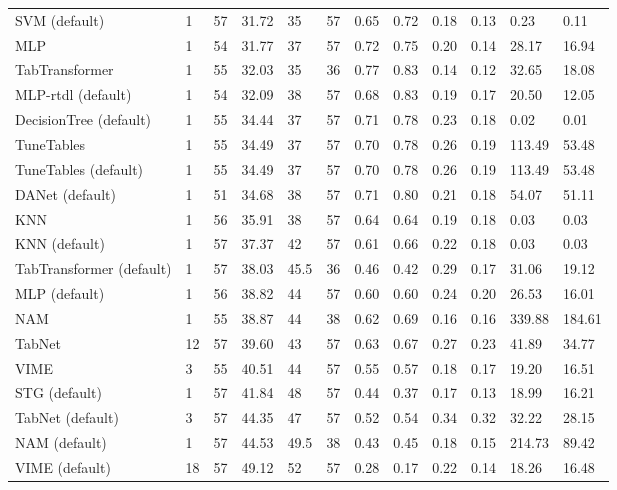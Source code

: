 \begin{tabular}{lllllrllllll}
SVM (default) & 1 & 57 & 31.72 & 35 & 57 & 0.65 & 0.72 & 0.18 & 0.13 & 0.23 & 0.11 \\
MLP & 1 & 54 & 31.77 & 37 & 57 & 0.72 & 0.75 & 0.20 & 0.14 & 28.17 & 16.94 \\
TabTransformer & 1 & 55 & 32.03 & 35 & 36 & 0.77 & 0.83 & 0.14 & 0.12 & 32.65 & 18.08 \\
MLP-rtdl (default) & 1 & 54 & 32.09 & 38 & 57 & 0.68 & 0.83 & 0.19 & 0.17 & 20.50 & 12.05 \\
DecisionTree (default) & 1 & 55 & 34.44 & 37 & 57 & 0.71 & 0.78 & 0.23 & 0.18 & 0.02 & 0.01 \\
TuneTables & 1 & 55 & 34.49 & 37 & 57 & 0.70 & 0.78 & 0.26 & 0.19 & 113.49 & 53.48 \\
TuneTables (default) & 1 & 55 & 34.49 & 37 & 57 & 0.70 & 0.78 & 0.26 & 0.19 & 113.49 & 53.48 \\
DANet (default) & 1 & 51 & 34.68 & 38 & 57 & 0.71 & 0.80 & 0.21 & 0.18 & 54.07 & 51.11 \\
KNN & 1 & 56 & 35.91 & 38 & 57 & 0.64 & 0.64 & 0.19 & 0.18 & 0.03 & 0.03 \\
KNN (default) & 1 & 57 & 37.37 & 42 & 57 & 0.61 & 0.66 & 0.22 & 0.18 & 0.03 & 0.03 \\
TabTransformer (default) & 1 & 57 & 38.03 & 45.5 & 36 & 0.46 & 0.42 & 0.29 & 0.17 & 31.06 & 19.12 \\
MLP (default) & 1 & 56 & 38.82 & 44 & 57 & 0.60 & 0.60 & 0.24 & 0.20 & 26.53 & 16.01 \\
NAM & 1 & 55 & 38.87 & 44 & 38 & 0.62 & 0.69 & 0.16 & 0.16 & 339.88 & 184.61 \\
TabNet & 12 & 57 & 39.60 & 43 & 57 & 0.63 & 0.67 & 0.27 & 0.23 & 41.89 & 34.77 \\
VIME & 3 & 55 & 40.51 & 44 & 57 & 0.55 & 0.57 & 0.18 & 0.17 & 19.20 & 16.51 \\
STG (default) & 1 & 57 & 41.84 & 48 & 57 & 0.44 & 0.37 & 0.17 & 0.13 & 18.99 & 16.21 \\
TabNet (default) & 3 & 57 & 44.35 & 47 & 57 & 0.52 & 0.54 & 0.34 & 0.32 & 32.22 & 28.15 \\
NAM (default) & 1 & 57 & 44.53 & 49.5 & 38 & 0.43 & 0.45 & 0.18 & 0.15 & 214.73 & 89.42 \\
VIME (default) & 18 & 57 & 49.12 & 52 & 57 & 0.28 & 0.17 & 0.22 & 0.14 & 18.26 & 16.48 \\
\bottomrule
\end{tabular}
